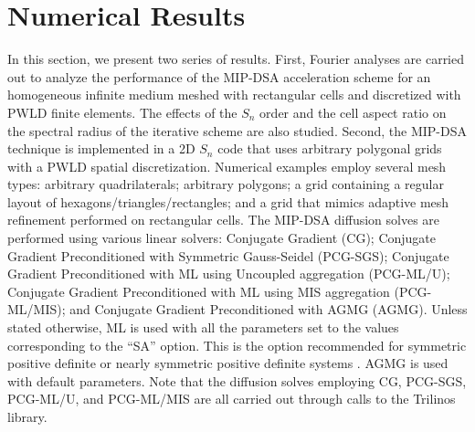 \documentclass[preprint,10pt]{elsarticle}
\renewcommand{\(}{\left(}
\renewcommand{\)}{\right)}
\renewcommand{\[}{\left[}
\renewcommand{\]}{\right]}
\newcommand{\sn}{\ensuremath{S_n}\xspace}
\begin{document}

\section{Numerical Results} \label{sec_res}

In this section, we present two series of results. First, Fourier analyses are 
carried out to analyze the performance of the MIP-DSA acceleration scheme 
for an homogeneous infinite medium meshed with rectangular cells and discretized with PWLD finite elements.
The effects of the $S_n$ order and the cell aspect ratio on the spectral radius of the iterative 
scheme are also studied. Second, the MIP-DSA technique is implemented in a 2D \sn code that uses
arbitrary polygonal grids with a PWLD spatial discretization.  Numerical examples employ
several mesh types: arbitrary quadrilaterals; arbitrary polygons; a grid containing a regular layout of 
hexagons/triangles/rectangles; and a grid that mimics adaptive mesh refinement 
performed on rectangular cells. The MIP-DSA diffusion solves are performed using various
linear solvers: Conjugate Gradient (CG); Conjugate Gradient
Preconditioned with Symmetric Gauss-Seidel (PCG-SGS); Conjugate Gradient
Preconditioned with ML using Uncoupled aggregation (PCG-ML/U);
Conjugate Gradient Preconditioned with ML using MIS aggregation (PCG-ML/MIS);
and Conjugate Gradient Preconditioned with AGMG (AGMG). Unless stated otherwise, ML is
used with all the parameters set to the values corresponding to the ``SA''
option. This is the option recommended for symmetric positive definite or nearly
symmetric positive definite systems \cite{ml_guide}. AGMG is used with default parameters.
Note that the diffusion solves employing CG, PCG-SGS, PCG-ML/U, and PCG-ML/MIS are all carried
out through calls to the Trilinos library.
\end{document}
